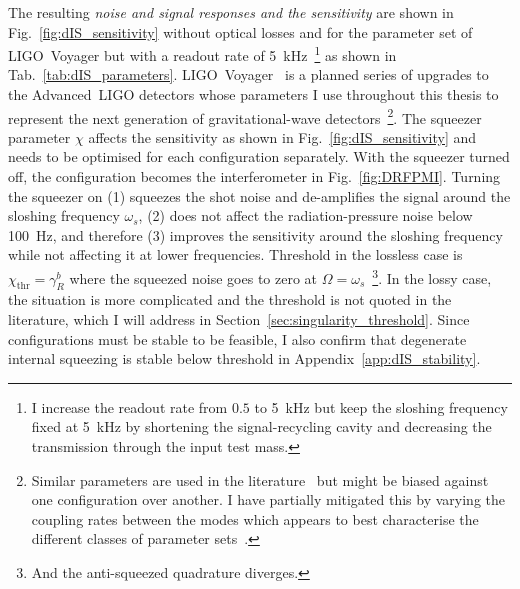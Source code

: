 The resulting \emph{noise and signal responses and the sensitivity} are shown in Fig.~\ref{fig:dIS_sensitivity} without optical losses and for the parameter set of LIGO~Voyager but with a readout rate of 5~kHz~\footnote{I increase the readout rate from $0.5$ to 5~kHz but keep the sloshing frequency fixed at 5~kHz by shortening the signal-recycling cavity and decreasing the transmission through the input test mass.} as shown in Tab.~\ref{tab:dIS_parameters}.
LIGO~Voyager~\cite{} is a planned series of upgrades to the Advanced~LIGO detectors whose parameters I use throughout this thesis to represent the next generation of gravitational-wave detectors~\footnote{Similar parameters are used in the literature~\cite{liBroadbandSensitivityImprovement2020,miaoDesignGravitationalWaveDetectors2018,korobkoQuantumExpanderGravitationalwave2019,} but might be biased against one configuration over another. I have partially mitigated this by varying the coupling rates between the modes which appears to best characterise the different classes of parameter sets~\cite{}.}.
The squeezer parameter $\chi$ affects the sensitivity as shown in Fig.~\ref{fig:dIS_sensitivity} and needs to be optimised for each configuration separately. With the squeezer turned off, the configuration becomes the interferometer in Fig.~\ref{fig:DRFPMI}. %
Turning the squeezer on (1) squeezes the shot noise and de-amplifies the signal around the sloshing frequency $\omega_s$, (2) does not affect the radiation-pressure noise below 100~Hz, and therefore (3) improves the sensitivity around the sloshing frequency while not affecting it at lower frequencies. 
Threshold in the lossless case is $\chi_\text{thr}=\gamma^b_R$ where the squeezed noise goes to zero at $\Omega=\omega_s$~\footnote{And the anti-squeezed quadrature diverges.}. In the lossy case, the situation is more complicated and the threshold is not quoted in the literature, which I will address in Section~\ref{sec:singularity_threshold}. Since configurations must be stable to be feasible, I also confirm that degenerate internal squeezing is stable below threshold in Appendix~\ref{app:dIS_stability}.
